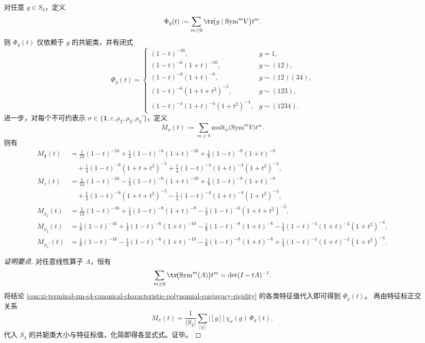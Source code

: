\begin{conclusion}\label{con:xi-terminal-zm-s4-symmetric-algebra-molien-isotypic-series}
对任意 \(g\in S_4\)，定义
\[
\Phi_g(t):=\sum_{m\ge0}\tr\!\bigl(g\mid \mathrm{Sym}^mV\bigr)t^m.
\]
则 \(\Phi_g(t)\) 仅依赖于 \(g\) 的共轭类，并有闭式
\[
\Phi_g(t)=
\begin{cases}
(1-t)^{-16}, & g=1,\\[1mm]
(1-t)^{-6}(1+t)^{-10}, & g\sim(12),\\[1mm]
(1-t)^{-8}(1+t)^{-8}, & g\sim(12)(34),\\[1mm]
(1-t)^{-6}(1+t+t^2)^{-5}, & g\sim(123),\\[1mm]
(1-t)^{-4}(1+t)^{-4}(1+t^2)^{-4}, & g\sim(1234).
\end{cases}
\]
进一步，对每个不可约表示
\(\sigma\in\{\mathbf 1,\varepsilon,\rho_2,\rho_3,\rho_3'\}\)，定义
\[
M_\sigma(t):=\sum_{m\ge0}\mathrm{mult}_\sigma\!\bigl(\mathrm{Sym}^mV\bigr)t^m.
\]
则有
\begin{align*}
M_{\mathbf 1}(t)
&=\frac1{24}(1-t)^{-16}
+\frac14(1-t)^{-6}(1+t)^{-10}
+\frac18(1-t)^{-8}(1+t)^{-8} \\
&\quad
+\frac13(1-t)^{-6}(1+t+t^2)^{-5}
+\frac14(1-t)^{-4}(1+t)^{-4}(1+t^2)^{-4},\\[1mm]
M_{\varepsilon}(t)
&=\frac1{24}(1-t)^{-16}
-\frac14(1-t)^{-6}(1+t)^{-10}
+\frac18(1-t)^{-8}(1+t)^{-8} \\
&\quad
+\frac13(1-t)^{-6}(1+t+t^2)^{-5}
-\frac14(1-t)^{-4}(1+t)^{-4}(1+t^2)^{-4},\\[1mm]
M_{\rho_2}(t)
&=\frac1{12}(1-t)^{-16}
+\frac14(1-t)^{-8}(1+t)^{-8}
-\frac13(1-t)^{-6}(1+t+t^2)^{-5},\\[1mm]
M_{\rho_3}(t)
&=\frac18(1-t)^{-16}
+\frac14(1-t)^{-6}(1+t)^{-10}
-\frac18(1-t)^{-8}(1+t)^{-8}
-\frac14(1-t)^{-4}(1+t)^{-4}(1+t^2)^{-4},\\[1mm]
M_{\rho_3'}(t)
&=\frac18(1-t)^{-16}
-\frac14(1-t)^{-6}(1+t)^{-10}
-\frac18(1-t)^{-8}(1+t)^{-8}
+\frac14(1-t)^{-4}(1+t)^{-4}(1+t^2)^{-4}.
\end{align*}
\end{conclusion}
\begin{proof}[证明要点]
对任意线性算子 \(A\)，恒有
\[
\sum_{m\ge0}\tr\!\bigl(\mathrm{Sym}^m(A)\bigr)t^m
=\det(I-tA)^{-1}.
\]
将结论 \ref{con:xi-terminal-zm-s4-canonical-characteristic-polynomial-conjugacy-rigidity} 的各类特征值代入即可得到 \(\Phi_g(t)\)。
再由特征标正交关系
\[
M_\sigma(t)=\frac1{|S_4|}\sum_{[g]}|[g]|\,\chi_\sigma(g)\,\Phi_g(t),
\]
代入 \(S_4\) 的共轭类大小与特征标值，化简即得各显式式。证毕。
\end{proof}

